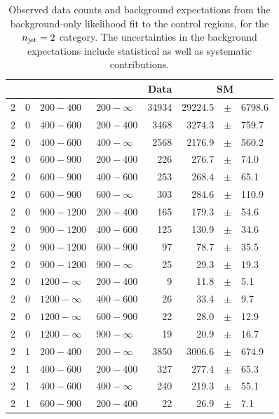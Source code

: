 \clearpage
\begin{table}[!h]
	\caption{
		Observed data counts and background expectations from the 
		background-only likelihood fit to the control regions, for the 
		$n_{\text{jet}}=2$ category. The uncertainties in the background expectations 
		include statistical as well as systematic contributions. 
	}
	\label{tab:cronly_sr_result-eq2j}
	\scriptsize
	\centering
	\begin{tabular}{rrllrrcl}
		\hline
		\njet\T\B & \nb & \scalht [GeV] & \mht [GeV] & Data & 
		\multicolumn{3}{c}{SM} \\ 
		\hline
		2\T & 0 & $ 200- 400$ & $200-\infty$ &  34934 &  29224.5 &$\pm$& 6798.6 
		\\
		2\T & 0 & $ 400- 600$ & $200-400$ &   3468 &   3274.3 &$\pm$&  759.7 \\
		2 & 0 & $ 400- 600$ & $400-\infty$ &   2568 &   2176.9 &$\pm$&  560.2 \\
		2\T & 0 & $ 600- 900$ & $200-400$ &    226 &    276.7 &$\pm$&   74.0 \\
		2 & 0 & $ 600- 900$ & $400-600$ &    253 &    268.4 &$\pm$&   65.1 \\
		2 & 0 & $ 600- 900$ & $600-\infty$ &    303 &    284.6 &$\pm$&  110.9 \\
		2\T & 0 & $ 900-1200$ & $200-400$ &    165 &    179.3 &$\pm$&   54.6 \\
		2 & 0 & $ 900-1200$ & $400-600$ &    125 &    130.9 &$\pm$&   34.6 \\
		2 & 0 & $ 900-1200$ & $600-900$ &     97 &     78.7 &$\pm$&   35.5 \\
		2 & 0 & $ 900-1200$ & $900-\infty$ &     25 &     29.3 &$\pm$&   19.3 \\
		2\T & 0 & $1200- \infty$ & $200-400$ &      9 &     11.8 &$\pm$&    5.1 
		\\
		2 & 0 & $1200- \infty$ & $400-600$ &     26 &     33.4 &$\pm$&    9.7 \\
		2 & 0 & $1200- \infty$ & $600-900$ &     22 &     28.0 &$\pm$&   12.9 \\
		2 & 0 & $1200- \infty$ & $900-\infty$ &     19 &     20.9 &$\pm$&   
		16.7 \\
		2\T & 1 & $ 200- 400$ & $200-\infty$ &   3850 &   3006.6 &$\pm$&  674.9 
		\\
		2\T & 1 & $ 400- 600$ & $200-400$ &    327 &    277.4 &$\pm$&   65.3 \\
		2 & 1 & $ 400- 600$ & $400-\infty$ &    240 &    219.3 &$\pm$&   55.1 \\
		2\T & 1 & $ 600- 900$ & $200-400$ &     22 &     26.9 &$\pm$&    7.1 \\

\end{tabular}
\end{table}
